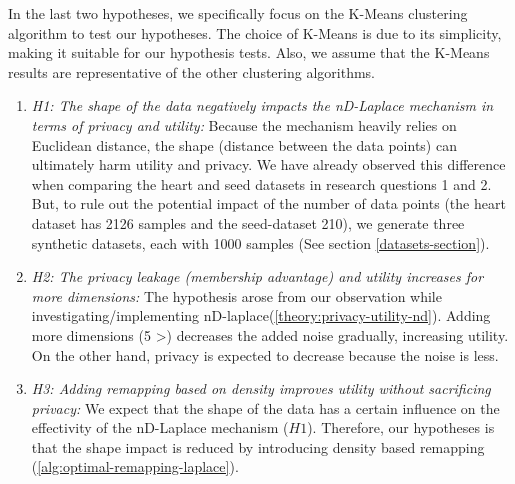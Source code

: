 \begin{enumerate}
        In the last two hypotheses, we specifically focus on the K-Means clustering algorithm to test our hypotheses.
        The choice of K-Means is due to its simplicity, making it suitable for our hypothesis tests.
        Also, we assume that the K-Means results are representative of the other clustering algorithms.
        \begin{enumerate}
          \item \textit{H1: The shape of the data negatively impacts the nD-Laplace mechanism in terms of privacy and utility:}
                Because the mechanism heavily relies on Euclidean distance, the shape (distance between the data points) can ultimately harm utility and privacy.
                We have already observed this difference when comparing the heart and seed datasets in research questions 1 and 2.
                But, to rule out the potential impact of the number of data points (the heart dataset has 2126 samples and the seed-dataset 210), we generate three synthetic datasets, each with 1000 samples (See section \ref{datasets-section}).
          \item \textit{H2: The privacy leakage (membership advantage) and utility increases for more dimensions:}
                The hypothesis arose from our observation while investigating/implementing nD-laplace(\ref{theory:privacy-utility-nd}).
                Adding more dimensions (5 >) decreases the added noise gradually, increasing utility.
                On the other hand, privacy is expected to decrease because the noise is less.
          \item \textit{H3: Adding remapping based on density improves utility without sacrificing privacy:}
                We expect that the shape of the data has a certain influence on the effectivity of the nD-Laplace mechanism ($H1$).
                Therefore, our hypotheses is that the shape impact is reduced by introducing density based remapping (\ref{alg:optimal-remapping-laplace}).
        \end{enumerate}
\end{enumerate}

